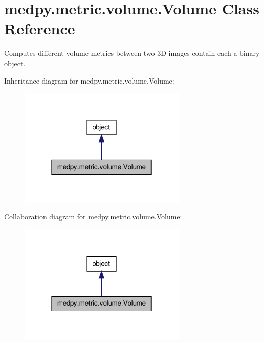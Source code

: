 \hypertarget{classmedpy_1_1metric_1_1volume_1_1Volume}{
\section{medpy.metric.volume.Volume Class Reference}
\label{classmedpy_1_1metric_1_1volume_1_1Volume}
}


Computes different volume metrics between two 3D-\/images contain each a binary object.  




Inheritance diagram for medpy.metric.volume.Volume:\nopagebreak
\begin{figure}[H]
\begin{center}
\leavevmode
\includegraphics[width=226pt]{classmedpy_1_1metric_1_1volume_1_1Volume__inherit__graph}
\end{center}
\end{figure}


Collaboration diagram for medpy.metric.volume.Volume:\nopagebreak
\begin{figure}[H]
\begin{center}
\leavevmode
\includegraphics[width=226pt]{classmedpy_1_1metric_1_1volume_1_1Volume__coll__graph}
\end{center}
\end{figure}
